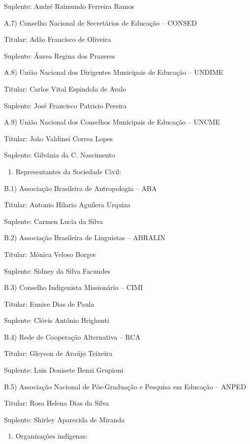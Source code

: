 \documentclass[
]{book}
\providecommand{\tightlist}{%
  \setlength{\itemsep}{0pt}\setlength{\parskip}{0pt}}
\begin{document}
Suplente: André Raimundo Ferreira Ramos

A.7) Conselho Nacional de Secretários de Educação -- CONSED

Titular: Adão Francisco de Oliveira

Suplente: Áurea Regina dos Prazeres

A.8) União Nacional dos Dirigentes Municipais de Educação -- UNDIME

Titular: Carlos Vital Espindola de Avalo

Suplente: José Francisco Patricio Pereira

A.9) União Nacional dos Conselhos Municipais de Educação -- UNCME

Titular: João Valdinei Correa Lopes

Suplente: Gilvânia da C. Nascimento

\begin{enumerate}
\def\labelenumi{\Alph{enumi})}
\setcounter{enumi}{1}
\tightlist
\item
  Representantes da Sociedade Civil:
\end{enumerate}

B.1) Associação Brasileira de Antropologia -- ABA

Titular: Antonio Hilario Aguilera Urquiza

Suplente: Carmen Lucia da Silva

B.2) Associação Brasileira de Linguistas -- ABRALIN

Titular: Mônica Veloso Borges

Suplente: Sidney da Silva Facundes

B.3) Conselho Indigenista Missionário -- CIMI

Titular: Eunice Dias de Paula

Suplente: Clóvis Antônio Brighenti

B.4) Rede de Cooperação Alternativa -- RCA

Titular: Gleyson de Araújo Teixeira

Suplente: Luis Donisete Benzi Grupioni

B.5) Associação Nacional de Pós-Graduação e Pesquisa em Educação -- ANPED

Titular: Rosa Helena Dias da Silva

Suplente: Shirley Aparecida de Miranda

\begin{enumerate}
\def\labelenumi{\Alph{enumi})}
\setcounter{enumi}{2}
\tightlist
\item
  Organizações indígenas:
\end{enumerate}
\end{document}
